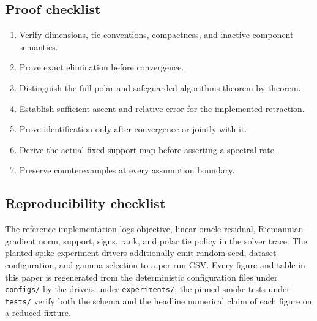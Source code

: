 \subsection{Proof checklist}
\begin{enumerate}[leftmargin=*]
\item Verify dimensions, tie conventions, compactness, and inactive-component semantics.
\item Prove exact elimination before convergence.
\item Distinguish the full-polar and safeguarded algorithms theorem-by-theorem.
\item Establish sufficient ascent and relative error for the implemented retraction.
\item Prove identification only after convergence or jointly with it.
\item Derive the actual fixed-support map before asserting a spectral rate.
\item Preserve counterexamples at every assumption boundary.
\end{enumerate}

\subsection{Reproducibility checklist}
The reference implementation logs objective, linear-oracle residual, Riemannian-gradient norm, support, signs, rank, and polar tie policy in the solver trace. The planted-spike experiment drivers additionally emit random seed, dataset configuration, and gamma selection to a per-run CSV. Every figure and table in this paper is regenerated from the deterministic configuration files under \texttt{configs/} by the drivers under \texttt{experiments/}; the pinned smoke tests under \texttt{tests/} verify both the schema and the headline numerical claim of each figure on a reduced fixture.
